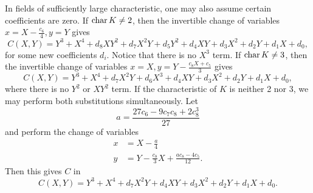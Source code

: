 In fields of sufficiently large characteristic, one may also assume certain coefficients are zero.
If $\operatorname{char} K \neq 2$, then the invertible change of variables $x = X - \frac {c_6} 4, y = Y$ gives
\begin{equation}
  \label{eq_c34_char_not_2}
  C(X,Y) = Y^3 + X^4 + d_8XY^2 + d_7X^2Y + d_5Y^2 + d_4XY + d_3X^2 + d_2Y + d_1X + d_0,
\end{equation}
for some new coefficients $d_i$.
Notice that there is no $X^3$ term.
If $\operatorname{char} K \neq 3$, then the invertible change of variables $x = X, y = Y - \frac{c_8X + c_5}{3}$ gives
\begin{equation}
  \label{eq_c34_char_not_3}
  C(X,Y) = Y^3 + X^4 + d_7X^2Y + d_6X^3 + d_4XY + d_3X^2 + d_2Y + d_1X + d_0,
\end{equation}
where there is no $Y^2$ or $XY^2$ term.
If the characteristic of $K$ is neither 2 nor 3, we may perform both substitutions simultaneously. Let
\[ a = \frac {27c_6 - 9c_7c_8 + 2c_8^3} {27} \]
and perform the change of variables
\begin{align*}
  x &= X - \frac a 4 \\
  y &= Y - \frac {c_8} {3} X + \frac {ac_8 - 4c_5} {12}.
\end{align*}
Then this gives $C$ in 
\begin{equation}
  \label{eq_c34_short}
  C(X,Y) = Y^3 + X^4 + d_7X^2Y + d_4XY + d_3X^2 + d_2Y + d_1X + d_0.
\end{equation}

